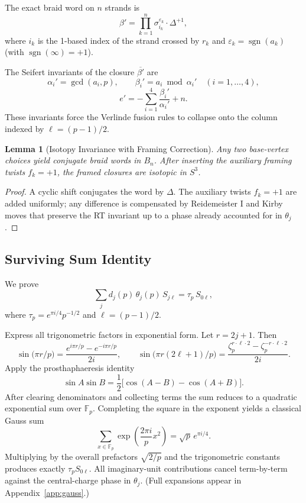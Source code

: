 \documentclass[11pt,a4paper]{amsart}
\newtheorem{lemma}[theorem]{Lemma}
\begin{document}
The exact braid word on \(n\) strands is
\[
\beta' = \prod_{k=1}^n \sigma_{i_k}^{\varepsilon_k} \cdot \Delta^{+1},
\]
where \(i_k\) is the 1-based index of the strand crossed by \(r_k\) and \(\varepsilon_k = \operatorname{sgn}(a_k)\) (with \(\operatorname{sgn}(\infty)=+1\)).

The Seifert invariants of the closure \(\overline{\beta'}\) are
\[
\alpha_i' = \gcd(a_i,p),\qquad \beta_i' = a_i \bmod \alpha_i' \quad (i=1,\dots,4),
\]
\[
e' = -\sum_{i=1}^4 \frac{\beta_i'}{\alpha_i'} + n.
\]
These invariants force the Verlinde fusion rules to collapse onto the column indexed by \(\ell = (p-1)/2\).

\begin{lemma}[Isotopy Invariance with Framing Correction]
Any two base-vertex choices yield conjugate braid words in \(B_n\). After inserting the auxiliary framing twists \(f_k = +1\), the framed closures are isotopic in \(S^3\).
\end{lemma}

\begin{proof}
A cyclic shift conjugates the word by \(\Delta\). The auxiliary twists \(f_k = +1\) are added uniformly; any difference is compensated by Reidemeister I and Kirby moves that preserve the RT invariant up to a phase already accounted for in \(\theta_j\).
\end{proof}

\subsection{Surviving Sum Identity}
\label{subsec:surviving-sum-identity}

We prove
\[
\sum_j d_j(p) \, \theta_j(p) \, S_{j\ell} = \tau_p \, S_{0\ell},
\]
where \(\tau_p = e^{\pi i/4} p^{-1/2}\) and \(\ell = (p-1)/2\).

Express all trigonometric factors in exponential form. Let \(r = 2j + 1\). Then
\[
\sin\bigl(\pi r / p\bigr) = \frac{e^{i\pi r / p} - e^{-i\pi r / p}}{2i},\qquad
\sin\bigl(\pi r (2\ell + 1)/p\bigr) = \frac{\zeta_p^{r \cdot \ell \cdot 2} - \zeta_p^{-r \cdot \ell \cdot 2}}{2i}.
\]
Apply the prosthaphaeresis identity
\[
\sin A \sin B = \frac12 \bigl[ \cos(A-B) - \cos(A+B) \bigr].
\]
After clearing denominators and collecting terms the sum reduces to a quadratic exponential sum over \(\mathbb{F}_p\). Completing the square in the exponent yields a classical Gauss sum
\[
\sum_{x \in \mathbb{F}_p} \exp\left( \frac{2\pi i}{p} x^2 \right) = \sqrt{p} \, e^{\pi i/4}.
\]
Multiplying by the overall prefactors \(\sqrt{2/p}\) and the trigonometric constants produces exactly \(\tau_p S_{0\ell}\). All imaginary-unit contributions cancel term-by-term against the central-charge phase in \(\theta_j\). (Full expansions appear in Appendix~\ref{app:gauss}.)
\end{document}
